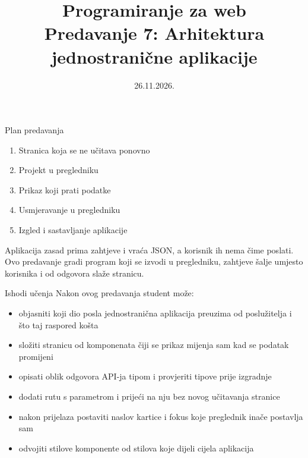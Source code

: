 

\title[Predavanje 7: Jednostranična aplikacija]{Programiranje za web \\ Predavanje 7: Arhitektura jednostranične aplikacije}
\date{26.11.2026.}



\frame{\titlepage}

\begin{frame}{Plan predavanja}
\begin{enumerate}
  \item Stranica koja se ne učitava ponovno
  \item Projekt u pregledniku
  \item Prikaz koji prati podatke
  \item Usmjeravanje u pregledniku
  \item Izgled i sastavljanje aplikacije
\end{enumerate}

\vspace{0.6em}
Aplikacija zasad prima zahtjeve i vraća JSON, a korisnik ih nema čime poslati. Ovo predavanje gradi program koji se izvodi u pregledniku, zahtjeve šalje umjesto korisnika i od odgovora slaže stranicu.
\end{frame}

\begin{frame}{Ishodi učenja}
Nakon ovog predavanja student može:

\begin{itemize}
  \itemsep0.2em
  \item objasniti koji dio posla jednostranična aplikacija preuzima od poslužitelja i što taj raspored košta
  \item složiti stranicu od komponenata čiji se prikaz mijenja sam kad se podatak promijeni
  \item opisati oblik odgovora API-ja tipom i provjeriti tipove prije izgradnje
  \item dodati rutu s parametrom i prijeći na nju bez novog učitavanja stranice
  \item nakon prijelaza postaviti naslov kartice i fokus koje preglednik inače postavlja sam
  \item odvojiti stilove komponente od stilova koje dijeli cijela aplikacija
\end{itemize}
\end{frame}

